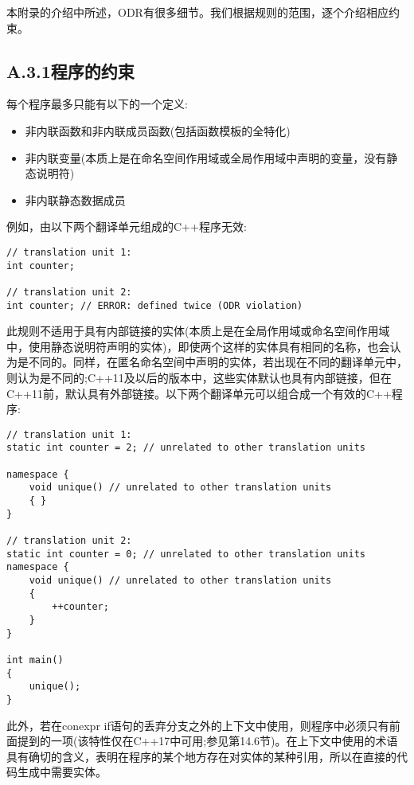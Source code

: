 
本附录的介绍中所述，ODR有很多细节。我们根据规则的范围，逐个介绍相应约束。

\subsection{A.3.1\hspace{0.2cm}程序的约束}

每个程序最多只能有以下的一个定义:

\begin{itemize}
\item 
非内联函数和非内联成员函数(包括函数模板的全特化)

\item 
非内联变量(本质上是在命名空间作用域或全局作用域中声明的变量，没有静态说明符)

\item 
非内联静态数据成员
\end{itemize}

例如，由以下两个翻译单元组成的C++程序无效:

\begin{lstlisting}[style=styleCXX]
// translation unit 1:
int counter;

// translation unit 2:
int counter; // ERROR: defined twice (ODR violation)
\end{lstlisting}

此规则不适用于具有内部链接的实体(本质上是在全局作用域或命名空间作用域中，使用静态说明符声明的实体)，即使两个这样的实体具有相同的名称，也会认为是不同的。同样，在匿名命名空间中声明的实体，若出现在不同的翻译单元中，则认为是不同的;C++11及以后的版本中，这些实体默认也具有内部链接，但在C++11前，默认具有外部链接。以下两个翻译单元可以组合成一个有效的C++程序:

\begin{lstlisting}[style=styleCXX]
// translation unit 1:
static int counter = 2; // unrelated to other translation units

namespace {
	void unique() // unrelated to other translation units
	{ }
}

// translation unit 2:
static int counter = 0; // unrelated to other translation units
namespace {
	void unique() // unrelated to other translation units
	{
		++counter;
	}
}

int main()
{
	unique();
}
\end{lstlisting}

此外，若在conexpr if语句的丢弃分支之外的上下文中使用，则程序中必须只有前面提到的一项(该特性仅在C++17中可用;参见第14.6节)。在上下文中使用的术语具有确切的含义，表明在程序的某个地方存在对实体的某种引用，所以在直接的代码生成中需要实体。


